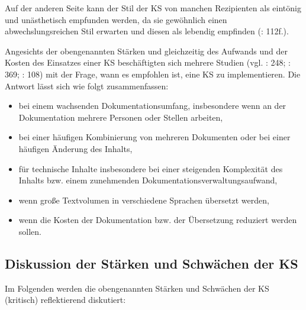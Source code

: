 Auf der anderen Seite kann der Stil der KS von manchen Rezipienten als eintönig und unästhetisch empfunden werden, da sie gewöhnlich einen abwechslungsreichen Stil erwarten und diesen als lebendig empfinden (\citealt{LehrndorferReuther2008}: 112f.).

Angesichts der obengenannten Stärken und gleichzeitig des Aufwands und der Kosten des Einsatzes einer KS beschäftigten sich mehrere Studien (vgl. \citealt{NybergEtAl2003}: 248; \citealt{Göpferich2008}: 369; \citealt{LehrndorferReuther2008}: 108) mit der Frage, wann es empfohlen ist, eine KS zu implementieren. Die Antwort lässt sich wie folgt zusammenfassen:

\begin{itemize}
\item bei einem wachsenden Dokumentationsumfang, insbesondere wenn an der Dokumentation mehrere Personen oder Stellen arbeiten,
\item bei einer häufigen Kombinierung von mehreren Dokumenten oder bei einer häufigen Änderung des Inhalts,
\item für technische Inhalte insbesondere bei einer steigenden Komplexität des Inhalts bzw. einem zunehmenden Dokumentationsverwaltungsaufwand,
\item wenn große Textvolumen in verschiedene Sprachen übersetzt werden,
\item wenn die Kosten der Dokumentation bzw. der Übersetzung reduziert werden sollen.
\end{itemize}

\subsection{Diskussion der Stärken und Schwächen der KS}

Im Folgenden werden die obengenannten Stärken und Schwächen der KS (kritisch) reflektierend diskutiert:

